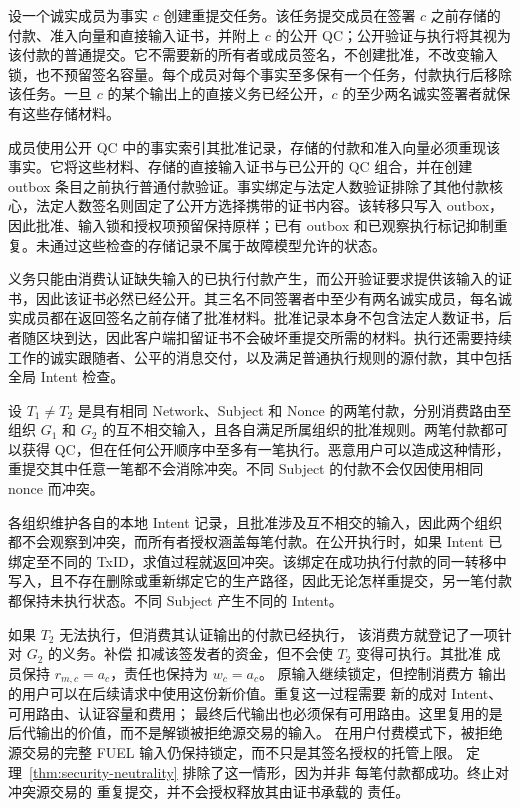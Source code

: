 \begin{lemma}[重提交保持授权不变]
\label{lem:security-resubmission}
设一个诚实成员为事实 $c$ 创建重提交任务。该任务提交成员在签署 $c$ 之前存储的付款、准入向量和直接输入证书，并附上 $c$ 的公开 QC；公开验证与执行将其视为该付款的普通提交。它不需要新的所有者或成员签名，不创建批准，不改变输入锁，也不预留签名容量。每个成员对每个事实至多保有一个任务，付款执行后移除该任务。一旦 $c$ 的某个输出上的直接义务已经公开，$c$ 的至少两名诚实签署者就保有这些存储材料。
\end{lemma}
\begin{IEEEproof}
成员使用公开 QC 中的事实索引其批准记录，存储的付款和准入向量必须重现该事实。它将这些材料、存储的直接输入证书与已公开的 QC 组合，并在创建 outbox 条目之前执行普通付款验证。事实绑定与法定人数验证排除了其他付款核心，法定人数签名则固定了公开方选择携带的证书内容。该转移只写入 outbox，因此批准、输入锁和授权项预留保持原样；已有 outbox 和已观察执行标记抑制重复。未通过这些检查的存储记录不属于故障模型允许的状态。

义务只能由消费认证缺失输入的已执行付款产生，而公开验证要求提供该输入的证书，因此该证书必然已经公开。其三名不同签署者中至少有两名诚实成员，每名诚实成员都在返回签名之前存储了批准材料。批准记录本身不包含法定人数证书，后者随区块到达，因此客户端扣留证书不会破坏重提交所需的材料。执行还需要持续工作的诚实跟随者、公平的消息交付，以及满足普通执行规则的源付款，其中包括全局 Intent 检查。
\end{IEEEproof}

\begin{lemma}
\label{lem:security-intent}
设 $T_1\ne T_2$ 是具有相同 Network、Subject 和 Nonce 的两笔付款，分别消费路由至组织 $G_1$ 和 $G_2$ 的互不相交输入，且各自满足所属组织的批准规则。两笔付款都可以获得 QC，但在任何公开顺序中至多有一笔执行。恶意用户可以造成这种情形，重提交其中任意一笔都不会消除冲突。不同 Subject 的付款不会仅因使用相同 nonce 而冲突。
\end{lemma}
\begin{IEEEproof}
各组织维护各自的本地 Intent 记录，且批准涉及互不相交的输入，因此两个组织都不会观察到冲突，而所有者授权涵盖每笔付款。在公开执行时，如果 Intent 已绑定至不同的 TxID，求值过程就返回冲突。该绑定在成功执行付款的同一转移中写入，且不存在删除或重新绑定它的生产路径，因此无论怎样重提交，另一笔付款都保持未执行状态。不同 Subject 产生不同的 Intent。
\end{IEEEproof}

如果 $T_2$ 无法执行，但消费其认证输出的付款已经执行，
该消费方就登记了一项针对 $G_2$ 的义务。补偿
扣减该签发者的资金，但不会使 $T_2$ 变得可执行。其批准
成员保持 $r_{m,c}=a_c$，责任也保持为 $w_c=a_c$。
原输入继续锁定，但控制消费方
输出的用户可以在后续请求中使用这份新价值。重复这一过程需要
新的成对 Intent、可用路由、认证容量和费用；
最终后代输出也必须保有可用路由。这里复用的是
后代输出的价值，而不是解锁被拒绝源交易的输入。
在用户付费模式下，被拒绝源交易的完整
FUEL 输入仍保持锁定，而不只是其签名授权的托管上限。
定理~\ref{thm:security-neutrality} 排除了这一情形，因为并非
每笔付款都成功。终止对冲突源交易的
重复提交，并不会授权释放其由证书承载的
责任。

